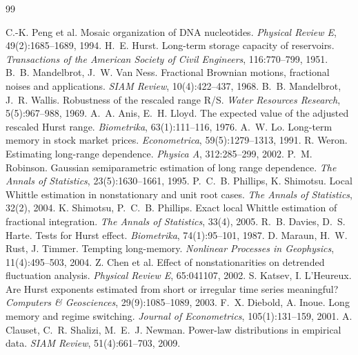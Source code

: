 \documentclass[12pt,a4paper]{report}
\theoremstyle{definition}
\begin{document}
\begin{thebibliography}{99}

 C.-K. Peng et al. Mosaic organization of DNA nucleotides. \textit{Physical Review E}, 49(2):1685--1689, 1994.
 H.~E. Hurst. Long-term storage capacity of reservoirs. \textit{Transactions of the American Society of Civil Engineers}, 116:770--799, 1951.
 B.~B. Mandelbrot, J.~W. Van Ness. Fractional Brownian motions, fractional noises and applications. \textit{SIAM Review}, 10(4):422--437, 1968.
 B.~B. Mandelbrot, J.~R. Wallis. Robustness of the rescaled range R/S. \textit{Water Resources Research}, 5(5):967--988, 1969.
 A.~A. Anis, E.~H. Lloyd. The expected value of the adjusted rescaled Hurst range. \textit{Biometrika}, 63(1):111--116, 1976.
 A.~W. Lo. Long-term memory in stock market prices. \textit{Econometrica}, 59(5):1279--1313, 1991.
 R. Weron. Estimating long-range dependence. \textit{Physica A}, 312:285--299, 2002.
 P.~M. Robinson. Gaussian semiparametric estimation of long range dependence. \textit{The Annals of Statistics}, 23(5):1630--1661, 1995.
 P.~C.~B. Phillips, K. Shimotsu. Local Whittle estimation in nonstationary and unit root cases. \textit{The Annals of Statistics}, 32(2), 2004.
 K. Shimotsu, P.~C.~B. Phillips. Exact local Whittle estimation of fractional integration. \textit{The Annals of Statistics}, 33(4), 2005.
 R.~B. Davies, D.~S. Harte. Tests for Hurst effect. \textit{Biometrika}, 74(1):95--101, 1987.
 D. Maraun, H.~W. Rust, J. Timmer. Tempting long-memory. \textit{Nonlinear Processes in Geophysics}, 11(4):495--503, 2004.
 Z. Chen et al. Effect of nonstationarities on detrended fluctuation analysis. \textit{Physical Review E}, 65:041107, 2002.
 S. Katsev, I. L'Heureux. Are Hurst exponents estimated from short or irregular time series meaningful? \textit{Computers \& Geosciences}, 29(9):1085--1089, 2003.
 F.~X. Diebold, A. Inoue. Long memory and regime switching. \textit{Journal of Econometrics}, 105(1):131--159, 2001.
 A. Clauset, C.~R. Shalizi, M.~E.~J. Newman. Power-law distributions in empirical data. \textit{SIAM Review}, 51(4):661--703, 2009.

\end{thebibliography}
\end{document}
